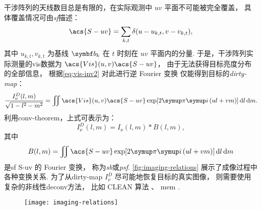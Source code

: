 干涉阵列的天线数目总是有限的，在实际观测中 $uv$ 平面不可能被完全覆盖，
具体覆盖情况可由\emph{\acf{sf}}描述：
\begin{equation}
  \label{eq:sf}
  \acs{S-uv} = \sum_{k,t} \delta(u - u_{k,t}, v - v_{k,t}),
\end{equation}
其中 $u_{k,t}, v_{k,t}$ 为基线 $\B{b}_k$ 在 $t$ 时刻在 $uv$ 平面内的分量.
于是，干涉阵列实际测量的\ac{vis}数据为 $\acs{Vis}(u,v) \acs{S-uv}$，
由于无法获得目标亮度分布的全部信息，
根据\autoref{eq:vis-inv2} 对此进行逆 Fourier 变换
仅能得到目标的\emph{\acf{dirty-map}}：
\begin{equation}
  \label{eq:dirty-map}
  \frac{I_{\nu}^D(l,m)}{\sqrt{1-l^2-m^2}} = \iint
    \acs{Vis}(u,v) \acs{S-uv} \exp [2\Cpi\Ci\, (ul+vm)] \,\D{l}\,\D{m}.
\end{equation}
利用\ac{conv-theorem}，上式可表示为：
\begin{equation}
  I_{\nu}^D(l,m) = I_{\nu}(l,m) * B(l,m),
\end{equation}
其中
\begin{equation}
  \label{eq:syn-beam}
  B(l,m) = \iint \acs{S-uv} \exp [2\Cpi\Ci\, (ul+vm)] \,\D{l}\,\D{m}
\end{equation}
是\ac{sf} \acs{S-uv} 的 Fourier 变换，
称为\emph{\acf{sb}}或\emph{\acf{psf}}.
\autoref{fig:imaging-relations} 展示了成像过程中各种变换关系.
为了从\ac{dirty-map} $I_{\nu}^D$ 尽可能地恢复目标的真实图像，
则需要使用复杂的非线性\ac{deconv}方法，
比如 CLEAN 算法 \cite{hogbom1974,cornwell1999}、
\ac{mem} \cite{narayan1986}.

\begin{figure}[htp]
  \centering
  \texttt{[image: imaging-relations]}
  \label{fig:imaging-relations}
\end{figure}

